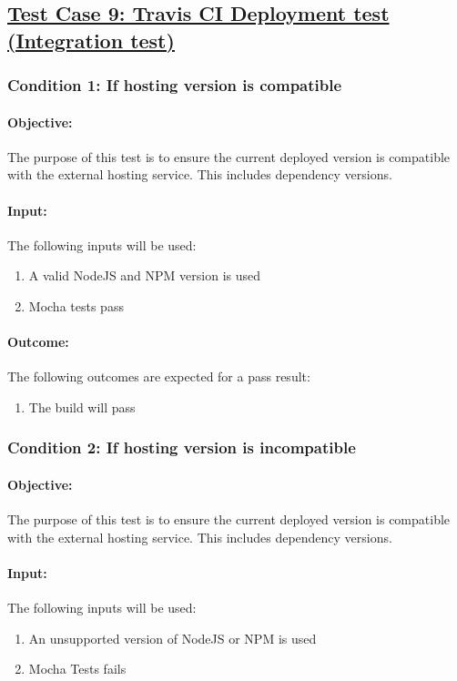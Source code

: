 \documentclass{article}
\begin{document}
\subsection{\underline{Test Case 9: Travis CI Deployment test (Integration test) }}\label{test9}
\subsubsection{Condition 1: If hosting version is compatible}
\paragraph{Objective:} The purpose of this test is to ensure the current deployed version is compatible with the external hosting service. This includes dependency versions.
\paragraph{Input:} The following inputs will be used:
\begin{enumerate}
	\item A valid NodeJS and NPM version is used
	\item Mocha tests pass
\end{enumerate}
\paragraph{Outcome:} The following outcomes are expected for a pass result:
\begin{enumerate}
	\item The build will pass
\end{enumerate}
\subsubsection{Condition 2: If hosting version is incompatible}
\paragraph{Objective:} The purpose of this test is to ensure the current deployed version is compatible with the external hosting service. This includes dependency versions.
\paragraph{Input:} The following inputs will be used:
\begin{enumerate}
	\item An unsupported version of NodeJS or NPM is used
	\item Mocha Tests fails
\end{enumerate}
\end{document}
